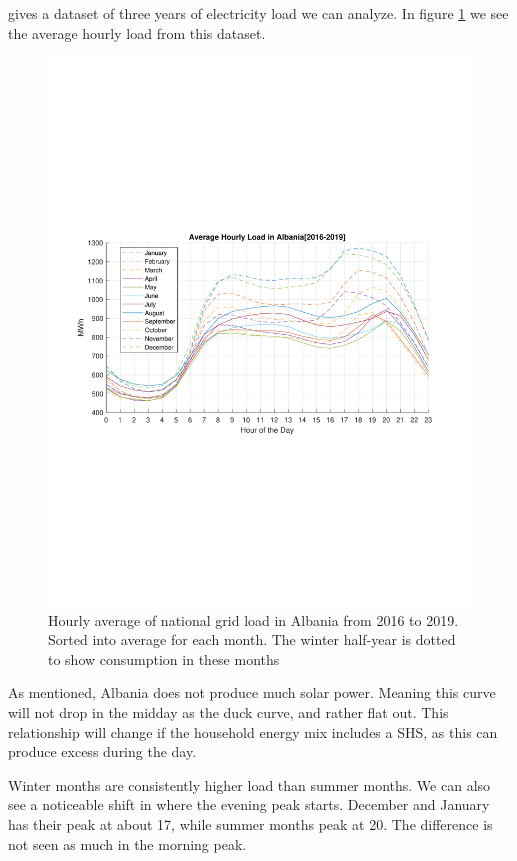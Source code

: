 \citep{sevdariDataDrivenAssessmentElectricity2022} gives a dataset of three years of electricity load we can analyze. In figure \ref{method:fig:gridloadalbania} we see the average hourly load from this dataset.
\begin{figure}[H]
    \centering
    \includegraphics[width=\linewidth]{photos/GridLoadAlbania_2016-2019.pdf}
    \caption{Hourly average of national grid load in Albania from 2016 to 2019. Sorted into average for each month. The winter half-year is dotted to show consumption in these months}
    \label{method:fig:gridloadalbania}
\end{figure}
As mentioned, Albania does not produce much solar power. Meaning this curve will not drop in the midday as the duck curve, and rather flat out. This relationship will change if the household energy mix includes a SHS, as this can produce excess during the day. 

Winter months are consistently higher load than summer months. We can also see a noticeable shift in where the evening peak starts. December and January has their peak at about 17, while summer months peak at 20. The difference is not seen as much in the morning peak. 

